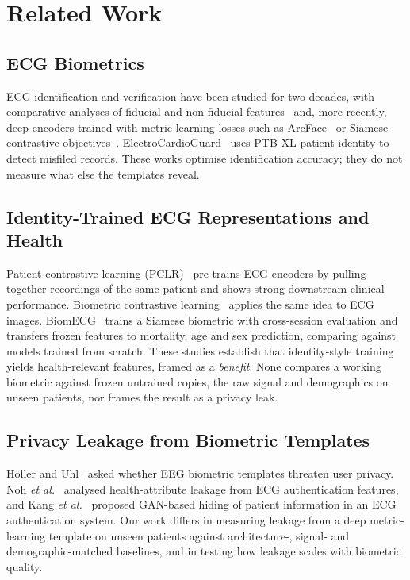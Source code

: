 \documentclass[journal]{IEEEtran}
\begin{document}
\section{Related Work}
\subsection{ECG Biometrics}
ECG identification and verification have been studied for two decades, with comparative analyses of fiducial and non-fiducial features~\cite{odinaka2012ecg} and, more recently, deep encoders trained with metric-learning losses such as ArcFace~\cite{deng2019arcface} or Siamese contrastive objectives~\cite{hadsell2006dimensionality}. ElectroCardioGuard~\cite{sejak2023electrocardioguard} uses PTB-XL patient identity to detect misfiled records. These works optimise identification accuracy; they do not measure what else the templates reveal.

\subsection{Identity-Trained ECG Representations and Health}
Patient contrastive learning (PCLR)~\cite{diamant2022pclr} pre-trains ECG encoders by pulling together recordings of the same patient and shows strong downstream clinical performance. Biometric contrastive learning~\cite{sangha2024bcl} applies the same idea to ECG images. BiomECG~\cite{thiebaud2026biomecg} trains a Siamese biometric with cross-session evaluation and transfers frozen features to mortality, age and sex prediction, comparing against models trained from scratch. These studies establish that identity-style training yields health-relevant features, framed as a \emph{benefit}. None compares a working biometric against frozen untrained copies, the raw signal and demographics on unseen patients, nor frames the result as a privacy leak.

\subsection{Privacy Leakage from Biometric Templates}
H\"oller and Uhl~\cite{holler2018eeg} asked whether EEG biometric templates threaten user privacy. Noh \emph{et al.}~\cite{noh2022broken} analysed health-attribute leakage from ECG authentication features, and Kang \emph{et al.}~\cite{kang2023gan} proposed GAN-based hiding of patient information in an ECG authentication system. Our work differs in measuring leakage from a deep metric-learning template on unseen patients against architecture-, signal- and demographic-matched baselines, and in testing how leakage scales with biometric quality.
\end{document}
